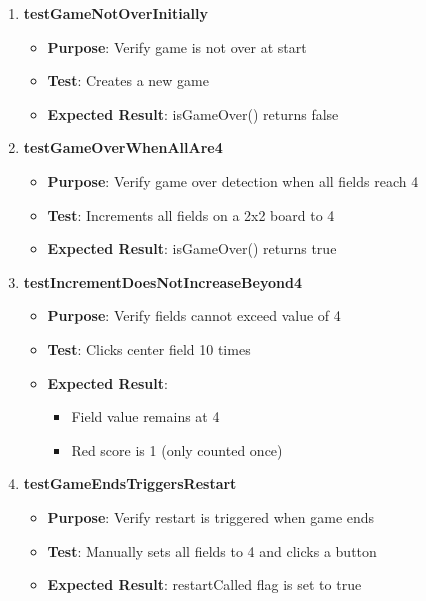 \documentclass[12pt,a4paper]{article}
\begin{document}
\begin{enumerate}
    \item \textbf{testGameNotOverInitially}
    \begin{itemize}
        \item \textbf{Purpose}: Verify game is not over at start
        \item \textbf{Test}: Creates a new game
        \item \textbf{Expected Result}: isGameOver() returns false
    \end{itemize}
    
    \item \textbf{testGameOverWhenAllAre4}
    \begin{itemize}
        \item \textbf{Purpose}: Verify game over detection when all fields reach 4
        \item \textbf{Test}: Increments all fields on a 2x2 board to 4
        \item \textbf{Expected Result}: isGameOver() returns true
    \end{itemize}
    
    \item \textbf{testIncrementDoesNotIncreaseBeyond4}
    \begin{itemize}
        \item \textbf{Purpose}: Verify fields cannot exceed value of 4
        \item \textbf{Test}: Clicks center field 10 times
        \item \textbf{Expected Result}: 
        \begin{itemize}
            \item Field value remains at 4
            \item Red score is 1 (only counted once)
        \end{itemize}
    \end{itemize}
    
    \item \textbf{testGameEndsTriggersRestart}
    \begin{itemize}
        \item \textbf{Purpose}: Verify restart is triggered when game ends
        \item \textbf{Test}: Manually sets all fields to 4 and clicks a button
        \item \textbf{Expected Result}: restartCalled flag is set to true
    \end{itemize}
\end{enumerate}
\end{document}

